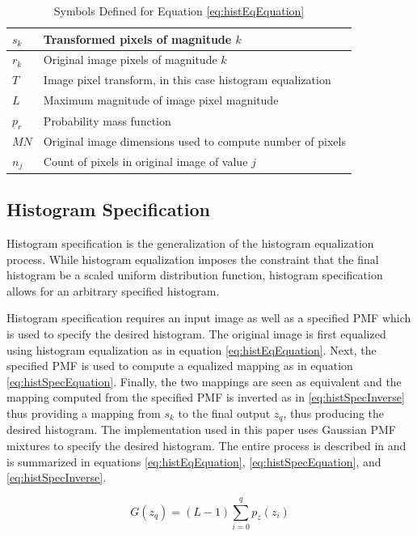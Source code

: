 \documentclass[journal]{IEEEtran}
\begin{document}
\begin{table}
 \centering
 \begin{tabular}{|l|l|}
  \hline
  \(s_k\) & Transformed pixels of magnitude \(k\) \\ \hline
  \(r_k\) & Original image pixels of magnitude \(k\) \\ \hline
  \(T\) & Image pixel transform, in this case histogram equalization \\ \hline
  \(L\) & Maximum magnitude of image pixel magnitude \\ \hline
  \(p_r\) & Probability mass function \\ \hline
  \(MN\) & Original image dimensions used to compute number of pixels \\ \hline
  \(n_j\) & Count of pixels in original image of value \(j\) \\ \hline
 \end{tabular}
 \caption{Symbols Defined for Equation \ref{eq:histEqEquation}}
 \label{tab:histEqTable}
\end{table}

\subsection{Histogram Specification}
Histogram specification is the generalization of the histogram equalization process. While histogram equalization imposes the constraint that the final histogram be a scaled uniform distribution function, histogram specification allows for an arbitrary specified histogram.
\par Histogram specification requires an input image as well as a specified PMF which is used to specify the desired histogram. The original image is first equalized using histogram equalization as in equation \ref{eq:histEqEquation}. Next, the specified PMF is used to compute a equalized mapping as in equation \ref{eq:histSpecEquation}. Finally, the two mappings are seen as equivalent and the mapping computed from the specified PMF is inverted as in \ref{eq:histSpecInverse} thus providing a mapping from \(s_k\) to the final output \(z_q\), thus producing the desired histogram. The implementation used in this paper uses Gaussian PMF mixtures to specify the desired histogram. The entire process is described in \cite[p.~128-138]{Gonzalez} and is summarized in equations \ref{eq:histEqEquation}, \ref{eq:histSpecEquation}, and \ref{eq:histSpecInverse}.

\begin{equation} \label{eq:histSpecEquation}
G(z_q) = (L-1)\sum_{i=0}^{q}p_z(z_i)
\end{equation}
\end{document}
